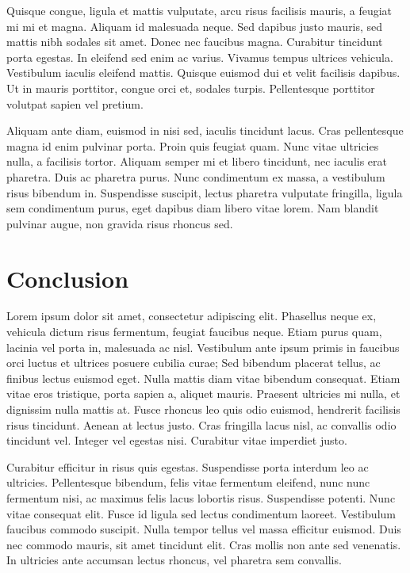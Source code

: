 \documentclass[
  oneside,
  open=any]{scrbook}
\begin{document}
Quisque congue, ligula et mattis vulputate, arcu risus facilisis mauris,
a feugiat mi mi et magna. Aliquam id malesuada neque. Sed dapibus justo
mauris, sed mattis nibh sodales sit amet. Donec nec faucibus magna.
Curabitur tincidunt porta egestas. In eleifend sed enim ac varius.
Vivamus tempus ultrices vehicula. Vestibulum iaculis eleifend mattis.
Quisque euismod dui et velit facilisis dapibus. Ut in mauris porttitor,
congue orci et, sodales turpis. Pellentesque porttitor volutpat sapien
vel pretium.

Aliquam ante diam, euismod in nisi sed, iaculis tincidunt lacus. Cras
pellentesque magna id enim pulvinar porta. Proin quis feugiat quam. Nunc
vitae ultricies nulla, a facilisis tortor. Aliquam semper mi et libero
tincidunt, nec iaculis erat pharetra. Duis ac pharetra purus. Nunc
condimentum ex massa, a vestibulum risus bibendum in. Suspendisse
suscipit, lectus pharetra vulputate fringilla, ligula sem condimentum
purus, eget dapibus diam libero vitae lorem. Nam blandit pulvinar augue,
non gravida risus rhoncus sed.

\chapter{Conclusion}\label{conclusion}

Lorem ipsum dolor sit amet, consectetur adipiscing elit. Phasellus neque
ex, vehicula dictum risus fermentum, feugiat faucibus neque. Etiam purus
quam, lacinia vel porta in, malesuada ac nisl. Vestibulum ante ipsum
primis in faucibus orci luctus et ultrices posuere cubilia curae; Sed
bibendum placerat tellus, ac finibus lectus euismod eget. Nulla mattis
diam vitae bibendum consequat. Etiam vitae eros tristique, porta sapien
a, aliquet mauris. Praesent ultricies mi nulla, et dignissim nulla
mattis at. Fusce rhoncus leo quis odio euismod, hendrerit facilisis
risus tincidunt. Aenean at lectus justo. Cras fringilla lacus nisl, ac
convallis odio tincidunt vel. Integer vel egestas nisi. Curabitur vitae
imperdiet justo.

Curabitur efficitur in risus quis egestas. Suspendisse porta interdum
leo ac ultricies. Pellentesque bibendum, felis vitae fermentum eleifend,
nunc nunc fermentum nisi, ac maximus felis lacus lobortis risus.
Suspendisse potenti. Nunc vitae consequat elit. Fusce id ligula sed
lectus condimentum laoreet. Vestibulum faucibus commodo suscipit. Nulla
tempor tellus vel massa efficitur euismod. Duis nec commodo mauris, sit
amet tincidunt elit. Cras mollis non ante sed venenatis. In ultricies
ante accumsan lectus rhoncus, vel pharetra sem convallis.
\end{document}
